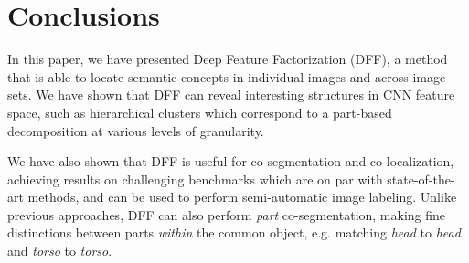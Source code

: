 \documentclass[runningheads]{llncs}
\begin{document}
	\section{Conclusions}
	In this paper, we have presented Deep Feature Factorization (DFF), a method that is able to locate semantic concepts in individual images and across image sets. We have shown that DFF can reveal interesting structures in CNN feature space, such as hierarchical clusters which correspond to a part-based decomposition at various levels of granularity.
	
	We have also shown that DFF is useful for co-segmentation and co-localization, achieving results on challenging benchmarks which are on par with state-of-the-art methods, and can be used to perform semi-automatic image labeling. Unlike previous approaches, DFF can also perform \emph{part} co-segmentation, making fine distinctions between parts \emph{within} the common object, e.g. matching \emph{head} to \emph{head} and \emph{torso} to \emph{torso}.

	\clearpage
	
	
\end{document}
